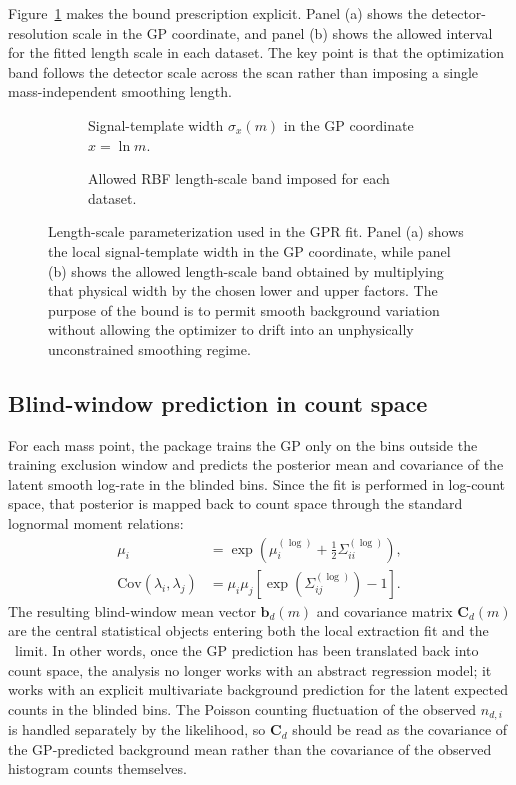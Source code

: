 Figure~\ref{fig:lengthscale-bounds} makes the bound prescription explicit. Panel (a)
shows the detector-resolution scale in the GP coordinate, and panel (b) shows the
allowed interval for the fitted length scale in each dataset. The key point is that the
optimization band follows the detector scale across the scan rather than imposing a
single mass-independent smoothing length.

\begin{figure}[H]
\centering
\begin{subfigure}[t]{0.48\linewidth}
  \centering
  \caption{Signal-template width $\sigma_x(m)$ in the GP coordinate $x=\ln m$.}
\end{subfigure}
\hfill
\begin{subfigure}[t]{0.48\linewidth}
  \centering
  \caption{Allowed RBF length-scale band imposed for each dataset.}
\end{subfigure}
\caption{Length-scale parameterization used in the GPR fit. Panel (a) shows the local
signal-template width in the GP coordinate, while panel (b) shows the allowed
length-scale band obtained by multiplying that physical width by the chosen lower and
upper factors. The purpose of the bound is to permit smooth background variation
without allowing the optimizer to drift into an unphysically unconstrained smoothing
regime.}
\label{fig:lengthscale-bounds}
\end{figure}

\subsection{Blind-window prediction in count space}

For each mass point, the package trains the GP only on the bins outside the training
exclusion window and predicts the posterior mean and covariance of the latent smooth
log-rate in the blinded bins. Since the fit is performed in log-count space, that
posterior is mapped back to count space through the standard lognormal moment
relations:
\begin{align}
\mu_i &= \exp\!\left(\mu^{(\log)}_i + \frac{1}{2}\Sigma^{(\log)}_{ii}\right), \\
\mathrm{Cov}(\lambda_i,\lambda_j)
&= \mu_i\mu_j\left[\exp\!\left(\Sigma^{(\log)}_{ij}\right)-1\right].
\end{align}
The resulting blind-window mean vector $\bm{b}_d(m)$ and covariance matrix
$\bm{C}_d(m)$ are the central statistical objects entering both the local extraction
fit and the \CLs\ limit. In other words, once the GP prediction has been translated
back into count space, the analysis no longer works with an abstract regression model;
it works with an explicit multivariate background prediction for the latent expected
counts in the blinded bins. The Poisson counting fluctuation of the observed
$n_{d,i}$ is handled separately by the likelihood, so $\bm{C}_d$ should be read as the
covariance of the GP-predicted background mean rather than the covariance of the
observed histogram counts themselves.

